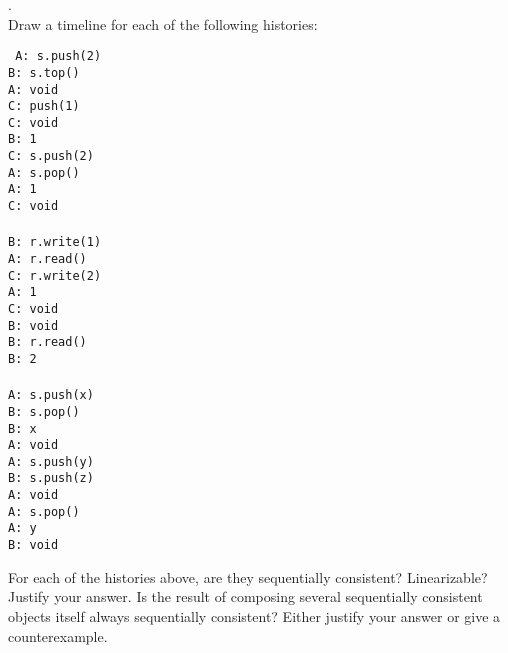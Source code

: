 \documentclass[main]{subfiles}
\begin{document}
\begin{ExerciseList}
        
        \Exercise[title={Linearizability and Sequential Consistency},label=LSC].\quad \\
            \Question Draw a timeline for each of the following histories: \\
                \vspace{-10pt}
                \begin{multicols*}{3}
                    \texttt{
                        \noindent A: s.push(2)\\
                        B: s.top() \\
                        A: void \\
                        C: push(1) \\
                        C: void \\
                        B: 1 \\
                        C: s.push(2) \\
                        A: s.pop() \\
                        A: 1 \\
                        C: void \\
                        \columnbreak
                         \\
                        B: r.write(1) \\
                        A: r.read() \\
                        C: r.write(2) \\
                        A: 1 \\
                        C: void \\
                        B: void \\
                        B: r.read() \\
                        B: 2 \\
                        \columnbreak
                         \\
                        A: s.push(x) \\
                        B: s.pop() \\
                        B: x \\
                        A: void \\
                        A: s.push(y) \\
                        B: s.push(z) \\
                        A: void \\
                        A: s.pop() \\
                        A: y \\
                        B: void
                    }
                \end{multicols*}
                \vspace{-10pt}
        \Question For each of the histories above, are they sequentially consistent? Linearizable? Justify your answer.
        \Question Is the result of composing several sequentially consistent objects itself always sequentially consistent? Either justify your answer or give a counterexample.
        

\end{ExerciseList}
\end{document}
